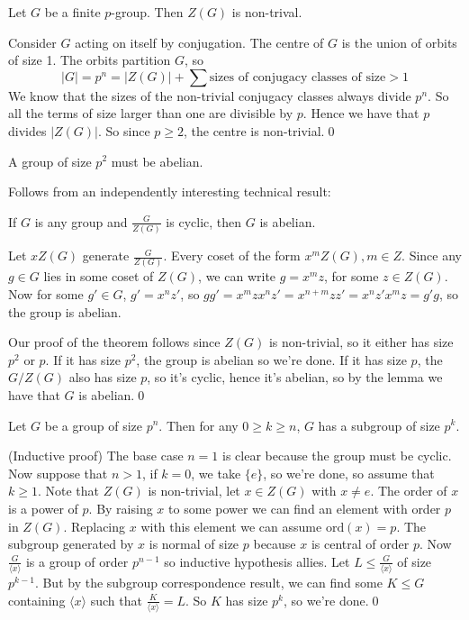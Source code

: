 \documentclass{article}
\begin{document}
\begin{theorem}
  Let $ G $ be a finite $ p $-group. Then $ Z(G) $ is non-trival.
\end{theorem}
\pf Consider $ G $ acting on itself by conjugation. The centre of $ G $ is the union of orbits of size 1. The orbits partition $ G $, so
\[
	|G|=p^n=|Z(G)|+\sum\text{sizes of conjugacy classes of size} > 1  
\]
We know that the sizes of the non-trivial conjugacy classes always divide $ p^n $. So all the terms of size larger than one are divisible by $ p $. Hence we have that $ p $ divides $ |Z(G)| $. So since $ p\ge 2 $, the centre is non-trivial.\qed
\begin{theorem}
  A group of size $ p^2 $ must be abelian.
\end{theorem}
\pf Follows from an independently interesting technical result:
\begin{lemma}
	If $ G $ is any group and $ \frac G{Z(G)} $ is cyclic, then $ G $ is abelian.
\end{lemma}
\pf Let $ xZ(G) $ generate $ \frac G{Z(G)} $. Every coset of the form $ x^mZ(G), m\in Z $. Since any $ g\in G $ lies in some coset of $ Z(G) $, we can write $ g=x^mz $, for some $ z\in Z(G) $. Now for some $ g'\in G $, $ g'=x^nz' $, so $ gg'=x^mzx^nz'=x^{n+m}zz'=x^nz'x^mz=g'g $, so the group is abelian.

\par
Our proof of the theorem follows since $ Z(G) $ is non-trivial, so it either has size $ p^2 $ or $ p $. If it has size $ p^2 $, the group is abelian so we're done. If it has size $ p $, the $ G/Z(G) $ also has size $ p $, so it's cyclic, hence it's abelian, so by the lemma we have that $ G $ is abelian.\qed
\begin{theorem}
  Let $ G $ be a group of size $ p^n $. Then for any $ 0\ge k \ge n$, $ G $ has a subgroup of size $ p^k $.
\end{theorem}
\pf (Inductive proof) The base case $ n=1 $ is clear because the group must be cyclic. Now suppose that $ n>1 $, if $ k=0 $, we take $ \{e\} $, so we're done, so assume that $ k\ge 1 $.  Note that $ Z(G) $ is non-trivial, let $ x\in Z(G) $ with $ x\ne e $. The order of $ x $ is a power of $ p $. By raising $ x $ to some power we can find an element with order $ p $ in $ Z(G) $. Replacing $ x $ with this element we can assume $ \mathrm{ord}(x)=p $. The subgroup generated by $ x $ is normal of size $ p $ because $ x $ is central of order $ p $. Now $ \frac{G}{\langle x\rangle} $ is a group of order $ p^{n-1} $ so inductive hypothesis allies. Let $ L\le \frac{G}{\langle x\rangle} $ of size $ p^{k-1} $. But by the subgroup correspondence result, we can find some $ K\le G $ containing $ \langle x\rangle $ such that $ \frac K{\langle x\rangle}=L $. So $ K $ has size $ p^k	 $, so we're done.\qed
\end{document}
